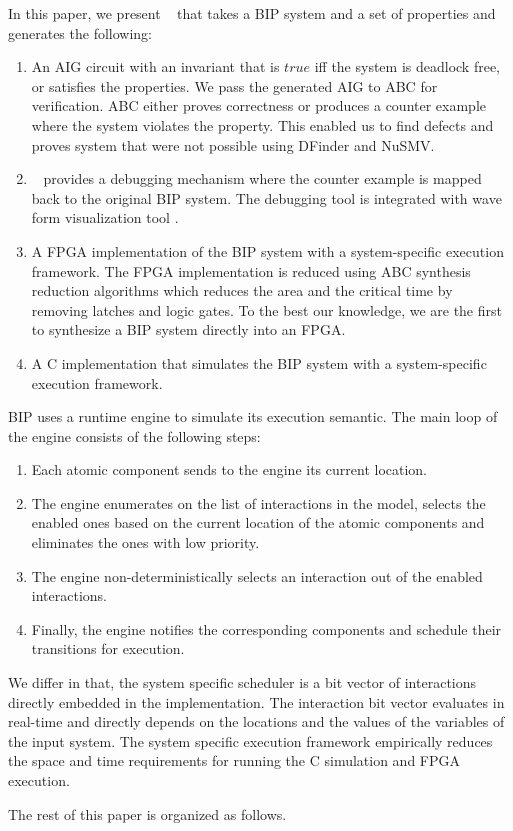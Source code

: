 In this paper, we present \biptool~ that takes a BIP system and a set of properties and generates the following:

\begin{enumerate}
\item An AIG circuit with an invariant that is $\mathit{true}$ iff the system is deadlock free, or satisfies the properties. We pass the generated AIG to ABC for verification. ABC either proves correctness or produces a counter example where the system violates the property. This enabled us to find defects and proves system that were not possible using DFinder and NuSMV. 
\item  \biptool~ provides a debugging mechanism where the counter example is mapped back to the original BIP system. The debugging tool is integrated with wave form visualization tool \cite{GTKWave}.  
\item A FPGA implementation of the BIP system with a system-specific execution framework. The FPGA implementation is reduced using ABC synthesis reduction algorithms which reduces the area and the critical time by removing latches and logic gates. To the best our knowledge, we are the first to synthesize a BIP system directly into an FPGA. 
\item A C implementation that simulates the BIP system with a system-specific execution framework. 
\end{enumerate}


BIP uses a runtime engine to simulate its execution semantic. The main loop of the engine consists of the following steps:
\begin{enumerate}
\item Each atomic component sends to the engine its current location.
\item The engine enumerates on the list of interactions in the model, selects the enabled ones based on the current location of the atomic components and eliminates the ones with low priority.
\item The engine non-deterministically selects an interaction out of the enabled interactions.
\item Finally, the engine notifies the corresponding components and schedule their transitions for execution. 
\end{enumerate}
We differ in that, the system specific scheduler is a bit vector of interactions directly embedded in the implementation. The interaction bit vector evaluates in real-time 
and directly depends on the locations and the values of the variables of the input system. The system specific execution framework empirically reduces the space and time requirements for running the C simulation and FPGA execution. 


The rest of this paper is organized as follows.
